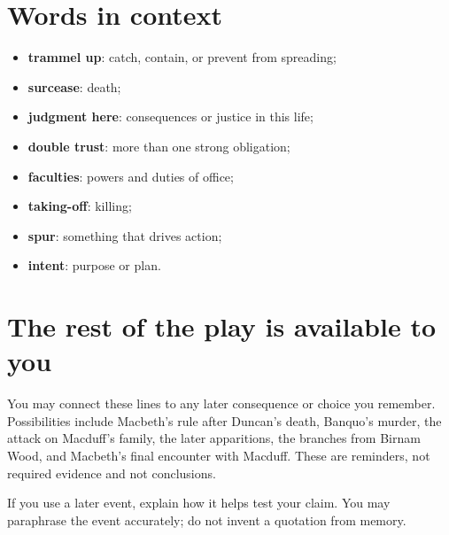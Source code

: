 \documentclass[11pt]{article}
\begin{document}
\section*{Words in context}

\begin{itemize}
\item \textbf{trammel up}: catch, contain, or prevent from spreading;
\item \textbf{surcease}: death;
\item \textbf{judgment here}: consequences or justice in this life;
\item \textbf{double trust}: more than one strong obligation;
\item \textbf{faculties}: powers and duties of office;
\item \textbf{taking-off}: killing;
\item \textbf{spur}: something that drives action;
\item \textbf{intent}: purpose or plan.
\end{itemize}

\section*{The rest of the play is available to you}

You may connect these lines to any later consequence or choice you remember. Possibilities include Macbeth's rule after Duncan's death, Banquo's murder, the attack on Macduff's family, the later apparitions, the branches from Birnam Wood, and Macbeth's final encounter with Macduff. These are reminders, not required evidence and not conclusions.

If you use a later event, explain how it helps test your claim. You may paraphrase the event accurately; do not invent a quotation from memory.
\end{document}
